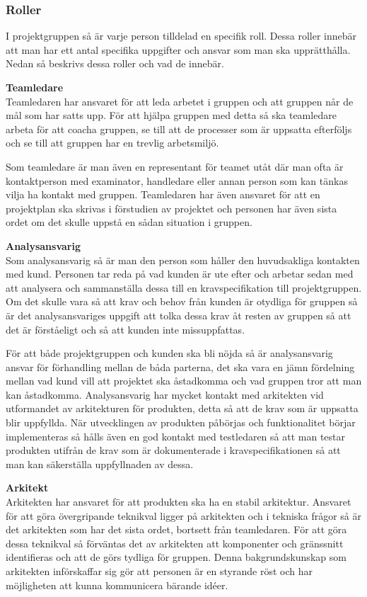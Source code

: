 \documentclass[a4paper,10pt]{article}
\begin{document}
\subsubsection{Roller}
I projektgruppen så är varje person tilldelad en specifik roll. Dessa roller innebär att man har ett antal specifika uppgifter och ansvar som man ska upprätthålla. Nedan så beskrivs dessa roller och vad de innebär.

\textbf{Teamledare}\\
Teamledaren har ansvaret för att leda arbetet i gruppen och att gruppen når de mål som har satts upp. För att hjälpa gruppen med detta så ska teamledare arbeta för att coacha gruppen, se till att de processer som är uppsatta efterföljs och se till att gruppen har en trevlig arbetsmiljö.

Som teamledare är man även en representant för teamet utåt där man ofta är kontaktperson med examinator, handledare eller annan person som kan tänkas vilja ha kontakt med gruppen. Teamledaren har även ansvaret för att en projektplan ska skrivas i förstudien av projektet och personen har även sista ordet om det skulle uppstå en sådan situation i gruppen.

\textbf{Analysansvarig}\\
Som analysansvarig så är man den person som håller den huvudsakliga kontakten med kund. Personen tar reda på vad kunden är ute efter och arbetar sedan med att analysera och sammanställa dessa till en kravspecifikation till projektgruppen. Om det skulle vara så att krav och behov från kunden är otydliga för gruppen så är det analysansvariges uppgift att tolka dessa krav åt resten av gruppen så att det är förståeligt och så att kunden inte missuppfattas.

För att både projektgruppen och kunden ska bli nöjda så är analysansvarig ansvar för förhandling mellan de båda parterna, det ska vara en jämn fördelning mellan vad kund vill att projektet ska åstadkomma och vad gruppen tror att man kan åstadkomma. Analysansvarig har mycket kontakt med arkitekten vid utformandet av arkitekturen för produkten, detta så att de krav som är uppsatta blir uppfyllda. När utvecklingen av produkten påbörjas och funktionalitet börjar implementeras så hålls även en god kontakt med testledaren så att man testar produkten utifrån de krav som är dokumenterade i kravspecifikationen så att man kan säkerställa uppfyllnaden av dessa.

\textbf{Arkitekt}\\
Arkitekten har ansvaret för att produkten ska ha en stabil arkitektur. Ansvaret för att göra övergripande teknikval ligger på arkitekten och i tekniska frågor så är det arkitekten som har det sista ordet, bortsett från teamledaren. För att göra dessa teknikval så förväntas det av arkitekten att komponenter och gränssnitt identifieras och att de görs tydliga för gruppen. Denna bakgrundskunskap som arkitekten införskaffar sig gör att personen är en styrande röst och har möjligheten att kunna kommunicera bärande idéer.
\end{document}
